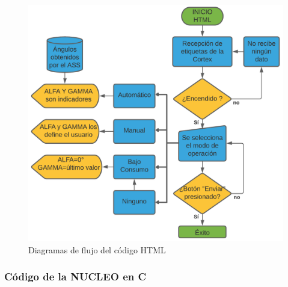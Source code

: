 \begin{figure}[H]
	\centering
	\includegraphics[width=\columnwidth]{imagenes/Diagrama HTML}
	\caption{Diagramas de flujo del código HTML}
	\label{fig:dia_flujHTML}
\end{figure}

\subsubsection{Código de la NUCLEO en C}

